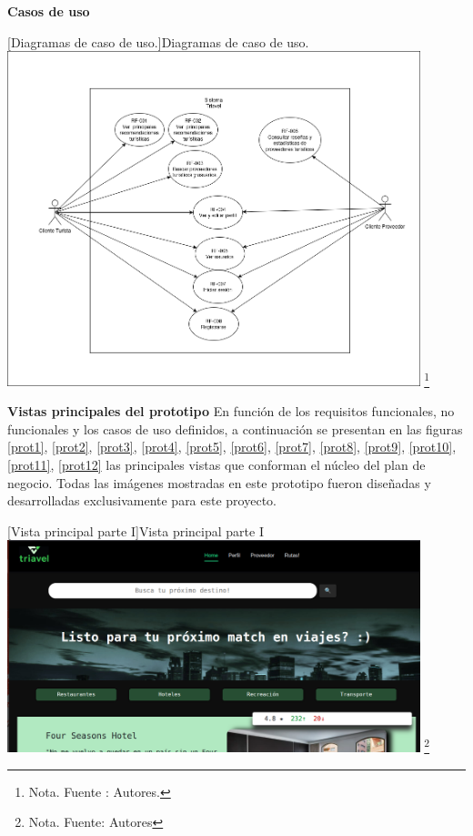 \textbf{Casos de uso}

    \vspace{2mm}
    \begin{minipage}{0.9\textwidth}
    \centering
    [{Diagramas de caso de uso.}]{Diagramas de caso de uso.}
    \label{caso1}
    \includegraphics[width=0.9\textwidth]{Content/Images/CasosDeUso.png}
    \footnote{Nota. \textup{Fuente : Autores.}}
    \end{minipage}


\textbf{Vistas principales del prototipo}
En función de los requisitos funcionales, no funcionales y los casos de uso definidos, a continuación se presentan en las figuras \ref{prot1}, \ref{prot2}, \ref{prot3}, \ref{prot4}, \ref{prot5}, \ref{prot6}, \ref{prot7}, \ref{prot8}, \ref{prot9}, \ref{prot10}, \ref{prot11}, \ref{prot12} las principales vistas que conforman el núcleo del plan de negocio. Todas las imágenes mostradas en este prototipo fueron diseñadas y desarrolladas exclusivamente para este proyecto.

    \vspace{2mm}
    \begin{minipage}{0.9\textwidth}
    \centering
    [{Vista principal parte I}]{Vista principal parte I}
    \label{prot1}
    \includegraphics[width=0.9\textwidth]{Content/Images/VistaGeneral1.png}
    \footnote{Nota. \textup{Fuente: Autores}}
    \end{minipage}

